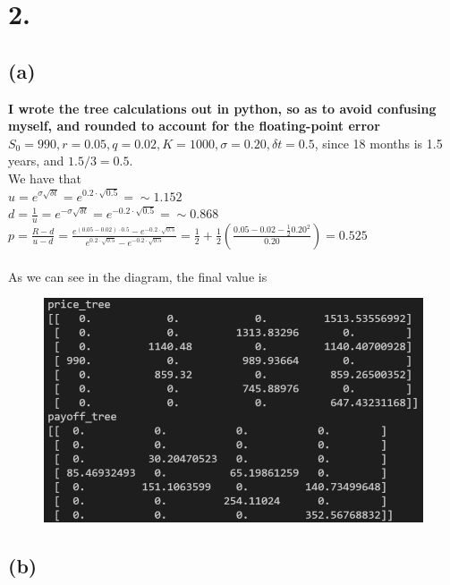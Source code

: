 \documentclass{article}
\begin{document}
\section*{2.}
{\Large

\subsection*{(a)}
\textbf{I wrote the tree calculations out in python, so as to avoid confusing myself, and rounded to account for the floating-point error} \\

$S_0 = 990, r = 0.05, q = 0.02, K = 1000, \sigma = 0.20, \delta t = 0.5$, since 18 months is 1.5 years, and $1.5 / 3 = 0.5$. \\
We have that \\
$u = e^{\sigma\sqrt{\delta t}} = e^{0.2 \cdot \sqrt{0.5}} = \sim 1.152$ \\
$d = \frac{1}{u} = e^{-\sigma\sqrt{\delta t}} = e^{-0.2 \cdot \sqrt{0.5}} = \sim 0.868$ \\
$p = \frac{R - d}{u - d} = \frac{e^{(0.05 - 0.02) \cdot 0.5} - e^{-0.2 \cdot \sqrt{0.5}}}{e^{0.2 \cdot \sqrt{0.5}} - e^{-0.2 \cdot \sqrt{0.5}}} = \frac{1}{2} + \frac{1}{2}(\frac{0.05 - 0.02 - \frac{1}{2}0.20^2}{0.20}) = 0.525$ \\ \\
As we can see in the diagram, the final value is 

\begin{figure}[h]
  \centering
  \includegraphics[width=120mm]{./2a.png}
\end{figure}

\subsection*{(b)}

}
\end{document}
